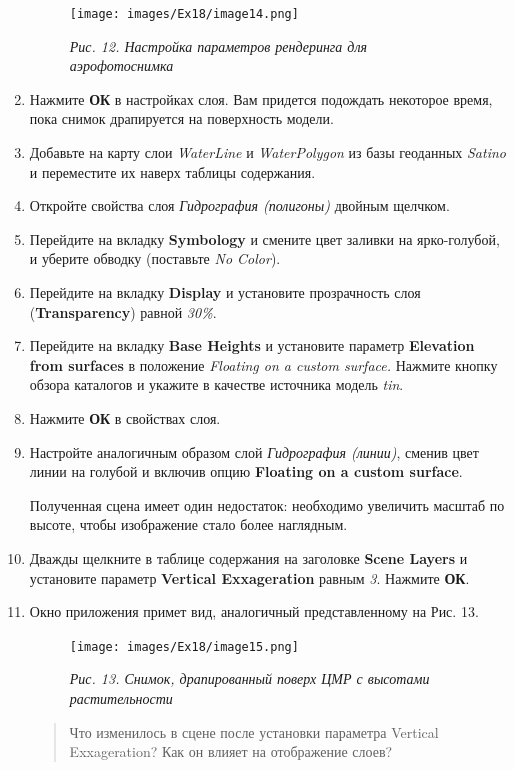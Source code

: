 \documentclass[12pt,]{book}
\begin{document}
\begin{enumerate}
  \begin{figure}
  \centering
  \texttt{[image: images/Ex18/image14.png]}
  \caption{\emph{Рис. 12. Настройка параметров рендеринга для аэрофотоснимка}}
  \end{figure}
\item
  Нажмите \textbf{ОК} в настройках слоя. Вам придется подождать некоторое время, пока снимок драпируется на поверхность модели.
\item
  Добавьте на карту слои \emph{WaterLine} и \emph{WaterPolygon} из базы геоданных \emph{Satino} и переместите их наверх таблицы содержания.
\item
  Откройте свойства слоя \emph{Гидрография (полигоны)} двойным щелчком.
\item
  Перейдите на вкладку \textbf{Symbology} и смените цвет заливки на ярко-голубой, и уберите обводку (поставьте \emph{No Color}).
\item
  Перейдите на вкладку \textbf{Display} и установите прозрачность слоя (\textbf{Transparency}) равной \emph{30\%}.
\item
  Перейдите на вкладку \textbf{Base Heights} и установите параметр \textbf{Elevation from surfaces} в положение \emph{Floating on a custom surface.} Нажмите кнопку обзора каталогов и укажите в качестве источника модель \emph{tin}.
\item
  Нажмите \textbf{ОК} в свойствах слоя.
\item
  Настройте аналогичным образом слой \emph{Гидрография (линии)}, сменив цвет линии на голубой и включив опцию \textbf{Floating on a custom surface}.

  Полученная сцена имеет один недостаток: необходимо увеличить масштаб по высоте, чтобы изображение стало более наглядным.
\item
  Дважды щелкните в таблице содержания на заголовке \textbf{Scene Layers} и установите параметр \textbf{Vertical Exxageration} равным \emph{3}. Нажмите \textbf{ОК}.
\item
  Окно приложения примет вид, аналогичный представленному на Рис. 13.

  \begin{figure}
  \centering
  \texttt{[image: images/Ex18/image15.png]}
  \caption{\emph{Рис. 13. Снимок, драпированный поверх ЦМР с высотами растительности}}
  \end{figure}

  \begin{quote}
  Что изменилось в сцене после установки параметра Vertical Exxageration? Как он влияет на отображение слоев?
  \end{quote}
\end{enumerate}
\end{document}
